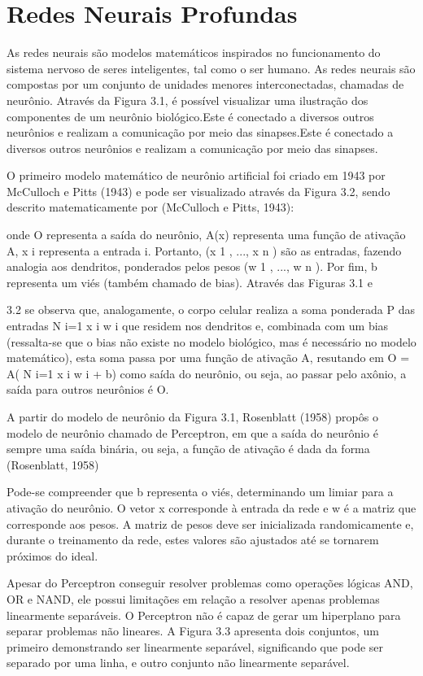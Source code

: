 \newpage
\section{Redes Neurais Profundas}

As redes neurais são modelos matemáticos inspirados no funcionamento do sistema nervoso de seres inteligentes, tal como o ser humano. As redes neurais são compostas por um conjunto de unidades menores interconectadas, chamadas de neurônio. Através da Figura 3.1, é possível visualizar uma ilustração dos componentes de um neurônio biológico.Este é conectado a diversos outros neurônios e realizam a comunicação por meio das sinapses.Este é conectado a diversos outros neurônios e realizam a comunicação por meio das sinapses.

O primeiro modelo matemático de neurônio artificial foi criado em 1943 por McCulloch e Pitts (1943) e pode ser visualizado através da Figura 3.2, sendo descrito matematicamente por (McCulloch e Pitts, 1943):

onde O representa a saída do neurônio, A(x) representa uma função de ativação A, x i representa a entrada i. Portanto, (x 1 , ..., x n ) são as entradas, fazendo analogia aos dendritos, ponderados pelos pesos (w 1 , ..., w n ). Por fim, b representa um viés (também chamado de bias). Através das Figuras 3.1 e

3.2 se observa que, analogamente, o corpo celular realiza a soma ponderada P das entradas N i=1 x i w i que residem nos dendritos e, combinada com um bias (ressalta-se que o bias não existe no modelo biológico, mas é necessário no modelo matemático), esta soma passa por uma função de ativação A, resutando em O = A( N i=1 x i w i + b) como saída do neurônio, ou seja, ao passar pelo axônio, a saída para outros neurônios é O.

A partir do modelo de neurônio da Figura 3.1, Rosenblatt (1958) propôs o modelo de neurônio chamado de Perceptron, em que a saída do neurônio é sempre uma saída binária, ou seja, a função de ativação é dada da forma (Rosenblatt, 1958)

Pode-se compreender que b representa o viés, determinando um limiar para a ativação do neurônio. O vetor x corresponde à entrada da rede e w é a matriz que corresponde aos pesos. A matriz de pesos deve ser inicializada randomicamente e, durante o treinamento da rede, estes valores são ajustados até se tornarem próximos do ideal.

Apesar do Perceptron conseguir resolver problemas como operações lógicas AND, OR e NAND, ele possui limitações em relação a resolver apenas problemas linearmente separáveis. O Perceptron não é capaz de gerar um hiperplano para separar problemas não lineares. A Figura 3.3 apresenta dois conjuntos, um primeiro demonstrando ser linearmente separável, significando que pode ser separado por uma linha, e outro conjunto não linearmente separável.

